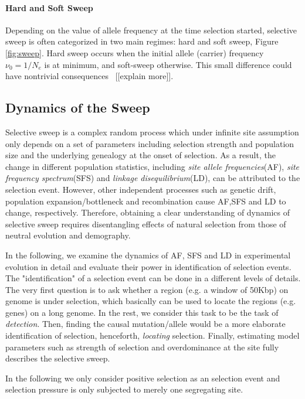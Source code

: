 \documentclass[11pt]{article}
\begin{document}
\paragraph{Hard and Soft Sweep}
Depending on the 
value of allele frequency at the time selection started, selective sweep is 
often 
categorized in two main regimes: hard and soft sweep, Figure \ref{fig:sweep}. 
Hard sweep occurs when the initial allele (carrier) frequency $\nu_0=1/N_e$ is 
at 
minimum, and soft-sweep otherwise. This small difference could have nontrivial
consequences~\cite{schrider2015soft} [[explain more]].

\subsection{Dynamics of the Sweep}
Selective sweep is a complex random process which under infinite site assumption
only depends on a set of parameters including selection strength and 
population size and the underlying genealogy at the onset of selection. 
As a result, the change in different population statistics, including 
\emph{site 
allele frequencies}(AF), \emph{site frequency spectrum}(SFS) and \emph{linkage 
disequilibrium}(LD), can be attributed to the selection event.
However, other independent processes such as genetic drift, 
population expansion/bottleneck and recombination cause AF,SFS and LD to 
change, respectively. Therefore, obtaining a clear understanding of dynamics of 
selective sweep  requires disentangling effects of natural selection from 
those of neutral evolution and demography.



 In the following, we examine the dynamics of AF, SFS and LD in experimental 
 evolution in detail and evaluate their power in identification of selection 
 events. 
 The "identification" of a selection event can be done in a different levels of 
 details. The very first question is to ask whether a region (e.g. a window of 
 50Kbp) on genome is under selection, which basically can be used to locate the 
 regions (e.g. genes) on a long genome. In the rest, we consider this task to 
 be the task of \emph{detection}.
 Then, finding the causal 
 mutation/allele would be a more elaborate identification of selection, 
 henceforth, \emph{locating} selection. 
 Finally, estimating model parameters such as strength of selection and 
 overdominance at the site fully describes the selective sweep.
 
 In the following we only consider positive selection as an selection event and 
 selection pressure is only subjected to merely one segregating site.
\end{document}
